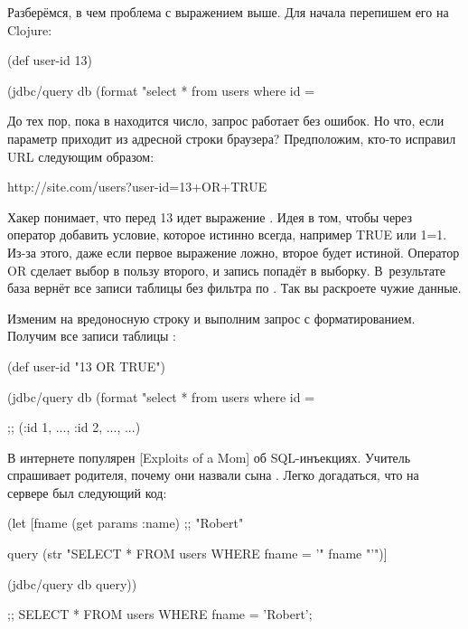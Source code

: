 Разберёмся, в чем проблема с выражением выше. Для начала перепишем его на Clojure:

\begin{english}
  \begin{clojure}
(def user-id 13)

(jdbc/query db
  (format "select * from users where id = %
  \end{clojure}
\end{english}

До тех пор, пока в  находится число, запрос работает без ошибок. Но что, если параметр приходит из адресной строки браузера? Предположим, кто-то исправил URL следующим образом:

\begin{english}
  \begin{text}
http://site.com/users?user-id=13+OR+TRUE
  \end{text}
\end{english}

Хакер понимает, что перед 13 идет выражение . Идея в том, чтобы через оператор  добавить условие, которое истинно всегда, например TRUE или 1=1. Из-за этого, даже если первое выражение ложно, второе будет истиной. Оператор OR сделает выбор в пользу второго, и запись попадёт в выборку. В~результате база вернёт все записи таблицы без фильтра по . Так вы раскроете чужие данные.

Изменим  на вредоносную строку и выполним запрос с форматированием. Получим все записи таблицы :

\begin{english}
  \begin{clojure}
(def user-id
  "13 OR TRUE")

(jdbc/query db
  (format "select * from users where id = %

;; ({:id 1, ...}, {:id 2, ...}, ...)
  \end{clojure}
\end{english}

\def\urlxkcdsql{https://xkcd.com/327/}


В интернете популярен \footurl{комикс Xkcd}{\urlxkcdsql}[Exploits of a Mom] об SQL-инъекциях. Учитель спрашивает родителя, почему они назвали сына . Легко догадаться, что на сервере был следующий код:

\begin{english}
  \begin{clojure}
(let [fname
      (get params :name) ;; "Robert"

      query
      (str "SELECT * FROM users WHERE fname = '"
           fname
           "'")]

  (jdbc/query db query))

;; SELECT * FROM users WHERE fname = 'Robert';
  \end{clojure}
\end{english}

